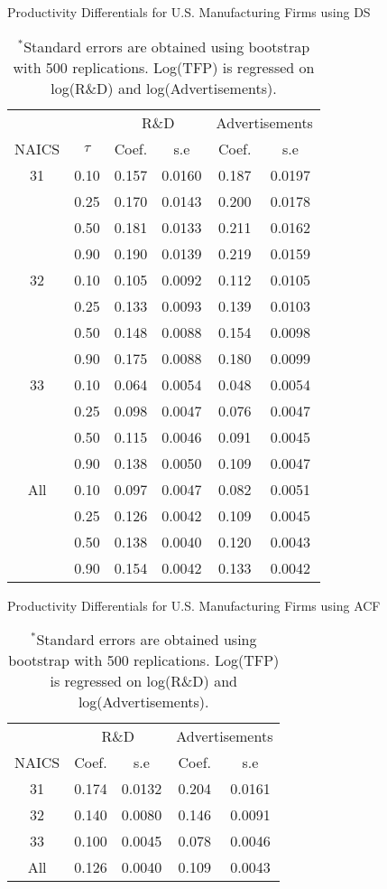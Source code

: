 \documentclass[12pt]{article}
\begin{document}
\begin{table}[H]
\centering
\caption{Productivity Differentials for U.S. Manufacturing Firms using DS}
\small
\begin{tabular}{cccccc}
  \hline\hline & & \multicolumn{2}{c}{R\&D}  & \multicolumn{2}{c}{Advertisements} \\ \cmidrule(lr){3-4} \cmidrule(lr){5-6}NAICS & $\tau$ & Coef. & s.e & Coef. & s.e \\ 
  \hline
31 & 0.10 & 0.157 & 0.0160 & 0.187 & 0.0197 \\ 
   & 0.25 & 0.170 & 0.0143 & 0.200 & 0.0178 \\ 
   & 0.50 & 0.181 & 0.0133 & 0.211 & 0.0162 \\ 
   & 0.90 & 0.190 & 0.0139 & 0.219 & 0.0159 \\ 
  32 & 0.10 & 0.105 & 0.0092 & 0.112 & 0.0105 \\ 
   & 0.25 & 0.133 & 0.0093 & 0.139 & 0.0103 \\ 
   & 0.50 & 0.148 & 0.0088 & 0.154 & 0.0098 \\ 
   & 0.90 & 0.175 & 0.0088 & 0.180 & 0.0099 \\ 
  33 & 0.10 & 0.064 & 0.0054 & 0.048 & 0.0054 \\ 
   & 0.25 & 0.098 & 0.0047 & 0.076 & 0.0047 \\ 
   & 0.50 & 0.115 & 0.0046 & 0.091 & 0.0045 \\ 
   & 0.90 & 0.138 & 0.0050 & 0.109 & 0.0047 \\ 
  All & 0.10 & 0.097 & 0.0047 & 0.082 & 0.0051 \\ 
   & 0.25 & 0.126 & 0.0042 & 0.109 & 0.0045 \\ 
   & 0.50 & 0.138 & 0.0040 & 0.120 & 0.0043 \\ 
   & 0.90 & 0.154 & 0.0042 & 0.133 & 0.0042 \\ 
   \hline
\end{tabular}
\caption*{\footnotesize $^{*}$Standard errors are obtained using bootstrap with 500 replications. Log(TFP) is regressed on log(R\&D) and log(Advertisements).}
\label{QACFUSTFPP}
\end{table}

\begin{table}[H]
\centering
\caption{Productivity Differentials for U.S. Manufacturing Firms using ACF}
\small
\begin{tabular}{ccccc}
  \hline\hline & \multicolumn{2}{c}{R\&D}  & \multicolumn{2}{c}{Advertisements} \\ \cmidrule(lr){2-3} \cmidrule(lr){4-5}NAICS & Coef. & s.e & Coef. & s.e \\ 
  \hline
31 & 0.174 & 0.0132 & 0.204 & 0.0161 \\ 
  32 & 0.140 & 0.0080 & 0.146 & 0.0091 \\ 
  33 & 0.100 & 0.0045 & 0.078 & 0.0046 \\ 
  All & 0.126 & 0.0040 & 0.109 & 0.0043 \\ 
   \hline
\end{tabular}
\caption*{\footnotesize $^{*}$Standard errors are obtained using bootstrap with 500 replications. Log(TFP) is regressed on log(R\&D) and log(Advertisements).}
\label{ACFUSTFPP}
\end{table}
\end{document}
